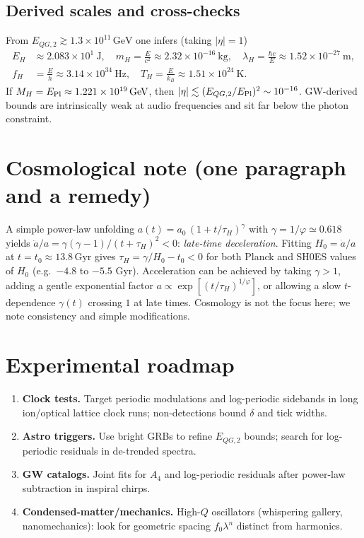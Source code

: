 \documentclass[11pt]{article}
\begin{document}
\subsection{Derived scales and cross-checks}
From \(E_{QG,2}\gtrsim 1.3\times 10^{11}\,\mathrm{GeV}\) one infers (taking \(|\eta|=1\))
\begin{align*}
E_H &\approx 2.083\times 10^{1}\ \mathrm{J},\quad
m_H = \frac{E}{c^2} \approx 2.32\times 10^{-16}\ \mathrm{kg},\quad
\lambda_H = \frac{\hbar c}{E} \approx 1.52\times 10^{-27}\ \mathrm{m},\\
f_H &= \frac{E}{h} \approx 3.14\times 10^{34}\ \mathrm{Hz},\quad
T_H = \frac{E}{k_B} \approx 1.51\times 10^{24}\ \mathrm{K}.
\end{align*}
If \(M_H=E_{\rm Pl}\approx 1.221\times 10^{19}\,\mathrm{GeV}\), then \(|\eta|\lesssim (E_{QG,2}/E_{\rm Pl})^2\sim 10^{-16}\). GW-derived bounds are intrinsically weak at audio frequencies and sit far below the photon constraint.

\section{Cosmological note (one paragraph and a remedy)}
A simple power-law unfolding \(a(t)=a_0\,(1+t/\tau_H)^\gamma\) with \(\gamma=1/\varphi\simeq 0.618\) yields
\(\ddot a/a = \gamma(\gamma-1)/(t+\tau_H)^2<0\): \emph{late-time deceleration}.
Fitting \(H_0=\dot a/a\) at \(t=t_0\approx 13.8\,\mathrm{Gyr}\) gives \(\tau_H=\gamma/H_0-t_0 < 0\) for both Planck and SH0ES values of \(H_0\) (e.g.\ \(-4.8\) to \(-5.5\) Gyr).
Acceleration can be achieved by taking \(\gamma>1\), adding a gentle exponential factor \(a\propto \exp[(t/\tau_H)^{1/\varphi}]\), or allowing a slow \(t\)-dependence \(\gamma(t)\) crossing \(1\) at late times.
Cosmology is not the focus here; we note consistency and simple modifications.

\section{Experimental roadmap}
\begin{enumerate}
\item \textbf{Clock tests.} Target periodic modulations and log-periodic sidebands in long ion/optical lattice clock runs; non-detections bound \(\delta\) and tick widths.
\item \textbf{Astro triggers.} Use bright GRBs to refine \(E_{QG,2}\) bounds; search for log-periodic residuals in de-trended spectra.
\item \textbf{GW catalogs.} Joint fits for \(A_4\) and log-periodic residuals after power-law subtraction in inspiral chirps.
\item \textbf{Condensed-matter/mechanics.} High-\(Q\) oscillators (whispering gallery, nanomechanics): look for geometric spacing \(f_0\lambda^n\) distinct from harmonics.
\end{enumerate}
\end{document}
